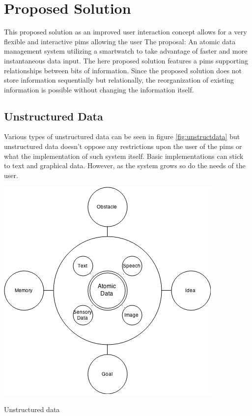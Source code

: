 \section{Proposed Solution}

This proposed solution as an improved user interaction concept allows for a very
flexible and interactive \gls{pims} allowing the user
The proposal: An atomic data management system utilizing a smartwatch to take advantage of faster and more instantaneous data input.
The here proposed solution features a \gls{pims} supporting relationships
between bits of information. Since the proposed solution does not store
information sequentially but relationally, the reorganization of existing
information is possible without changing the information itself.


\subsection{Unstructured Data}

Various types of unstructured data can be seen in figure \ref{fig:unstructdata}
but unstructured data doesn't oppose any restrictions upon the user of the
\gls{pims} or what the implementation of such system itself. Basic
implementations can stick to text and graphical data. However, as the system
grows so do the needs of the user.

\begin{flfigure}
  \centering
    \includegraphics[width=0.9\linewidth]{00_resources/atomic_data.png}
    \caption{Unstructured data}
  \label{fig:unstructdata}
\end{flfigure}

